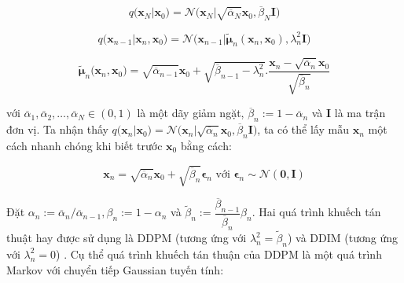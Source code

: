 \documentclass[14pt, a4paper]{article}
\numberwithin{equation}{section}
\numberwithin{figure}{section}
\numberwithin{dl}{section}
\numberwithin{md}{section}
\numberwithin{bd}{section}
\numberwithin{dn}{section}
\numberwithin{hq}{section}
\begin{document}
    \begin{equation}
        q\big( \boldsymbol{x}_N \vert \boldsymbol{x}_0 \big)=\mathcal{N} \big( \boldsymbol{x}_N \vert \sqrt{\overline{\alpha}_N} \boldsymbol{x}_0, \overline{\beta}_N \boldsymbol{I} \big)
    \end{equation}

    \begin{equation} \label{eq:Groundtruth-Reverse-Process}
        q\big( \boldsymbol{x}_{n-1} \vert \boldsymbol{x}_n, \boldsymbol{x}_0 \big)=\mathcal{N} \big( \boldsymbol{x}_{n-1} \vert \tilde{\boldsymbol{\mu}}_n (\boldsymbol{x}_n, \boldsymbol{x}_0), \lambda_n^2 \boldsymbol{I} \big)
    \end{equation}

    \begin{equation}
        \tilde{\boldsymbol{\mu}}_n \big( \boldsymbol{x}_n, \boldsymbol{x}_0 \big)=\sqrt{\overline{\alpha}_{n-1}}\boldsymbol{x}_0 + \sqrt{\overline{\beta}_{n-1} - \lambda_n^2}.\dfrac{\boldsymbol{x}_n - \sqrt{\overline{\alpha}_n}\boldsymbol{x}_0}{\sqrt{\overline{\beta}_n}}
    \end{equation}

    với $\overline{\alpha}_1, \overline{\alpha}_2, \dots, \overline{\alpha}_N \in (0, 1)$ là một dãy giảm ngặt,
    $\overline{\beta}_n := 1 - \overline{\alpha}_n$ và $\boldsymbol{I}$ là ma trận đơn vị.
    Ta nhận thấy $q\big( \boldsymbol{x}_n \vert \boldsymbol{x}_0 \big)=\mathcal{N} \big( \boldsymbol{x}_n \vert \sqrt{\overline{\alpha}_n} \boldsymbol{x}_0, \overline{\beta}_n \boldsymbol{I} \big)$,
    ta có thể lấy mẫu $\boldsymbol{x}_n$ một cách nhanh chóng khi biết trước $\boldsymbol{x}_0$ bằng cách:

    \begin{equation}
        \boldsymbol{x}_n = \sqrt{\overline{\alpha}_n} \boldsymbol{x}_0 + \sqrt{\overline{\beta}_n} \boldsymbol{\epsilon}_n \text{ với } \boldsymbol{\epsilon}_n \sim \mathcal{N}(\boldsymbol{0}, \boldsymbol{I})
    \end{equation}

    Đặt $\alpha_n := \overline{\alpha}_n / \overline{\alpha}_{n-1}, \beta_n := 1 - \alpha_n$ và $\tilde{\beta}_n := \dfrac{\overline{\beta}_{n-1}}{\overline{\beta}_n}\beta_n$.
    Hai quá trình khuếch tán thuật hay được sử dụng là DDPM (tương ứng với $\lambda_n^2=\tilde{\beta}_n$) \cite{ho2020denoising} và DDIM (tương ứng với $\lambda_n^2 = 0$) \cite{song2020denoising}.
    Cụ thể quá trình khuếch tán thuận của DDPM là một quá trình Markov với chuyển tiếp Gaussian tuyến tính:
\end{document}
